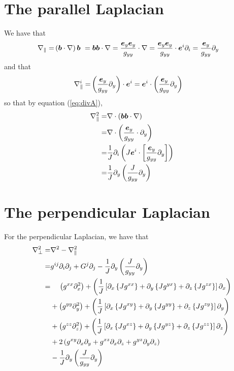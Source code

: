 \section{The parallel Laplacian}
%
We have that
%
\begin{align*}
    \nabla_\| =& \left(\boldsymbol{b} \cdot \nabla\right) \boldsymbol{b}\ = \boldsymbol{b} \boldsymbol{b} \cdot \nabla =
    \frac{\boldsymbol{e}_y \boldsymbol{e}_y}{g_{yy}} \cdot \nabla = \frac{\boldsymbol{e}_y
    \boldsymbol{e}_y}{g_{yy}} \cdot \boldsymbol{e}^i \partial_i = \frac{\boldsymbol{e}_y}{g_{yy}}
    \partial_y
\end{align*}
%
and that
%
\begin{align*}
    \nabla_\|^i =& \left(\frac{\boldsymbol{e}_y}{g_{yy}} \partial_y\right)\cdot \boldsymbol{e}^i =
    \boldsymbol{e}^i \cdot \left(\frac{\boldsymbol{e}_y}{g_{yy}} \partial_y\right)
\end{align*}
%
so that by equation (\ref{eq:divA}),
%
\begin{align*}
    \nabla_\|^2 =& \nabla\cdot\left(\boldsymbol{b} \boldsymbol{b} \cdot \nabla\right)\\ =&
    \nabla\cdot\left(\frac{\boldsymbol{e}_y}{g_{yy}} \cdot \partial_y\right)\\ =& \frac{1}{J}
    \partial_i \left( J\boldsymbol{e}^i \cdot \left[\frac{\boldsymbol{e}_y}{g_{yy}} \partial_y\right]
    \right)\\ =& \frac{1}{J} \partial_y \left(\frac{J}{g_{yy}} \partial_y\right)
\end{align*}


\section{The perpendicular Laplacian}
%
For the perpendicular Laplacian, we have that
%
\begin{align*}
    \grad_\perp^2 =& \grad^2 - \grad_\|^2\\ =& g^{ij} \partial_i \partial_j +
    G^j \partial_j -\frac{1}{J} \partial_y \L(\frac{J}{g_{yy}} \partial_y\R)\\
%
            =& \quad \, \L(g^{xx} \partial_x^2\R) + \L( \frac{1}{J} \L[
\partial_x \L\{J g^{xx} \R\} + \partial_y \L\{J g^{yx} \R\} + \partial_z \L\{J
g^{zx} \R\} \R] \partial_x\R)\\ &+ \L(g^{yy} \partial_y^2\R) + \L( \frac{1}{J}
    \L[ \partial_x \L\{J g^{xy} \R\} + \partial_y \L\{J g^{yy} \R\} +
    \partial_z \L\{J g^{zy} \R\} \R] \partial_y\R)\\ &+ \L(g^{zz}
        \partial_z^2\R) + \L( \frac{1}{J} \L[ \partial_x \L\{J g^{xz} \R\} +
        \partial_y \L\{J g^{yz} \R\} + \partial_z \L\{J g^{zz} \R\} \R]
        \partial_z\R)\\ &+ 2\L( g^{xy} \partial_x \partial_y + g^{xz}
        \partial_x \partial_z + g^{yz} \partial_y \partial_z \R)\\ &-
        \frac{1}{J} \partial_y \L(\frac{J}{g_{yy}} \partial_y\R)
\end{align*}
%


